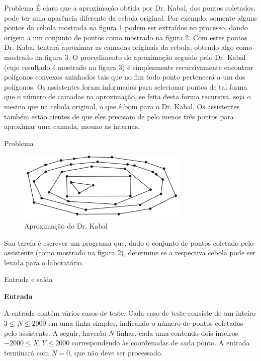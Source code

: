\begin{frame}[fragile]{Problema}
É claro que a aproximação obtida por Dr. Kabal, dos pontos coletados, pode ter uma aparência diferente da cebola original. Por exemplo, somente alguns pontos da cebola mostrada na figura 1 podem ser extraídos no processo, dando origem a um conjunto de pontos como mostrado na figura 2. Com estes pontos Dr. Kabal tentará aproximar as camadas originais da cebola, obtendo algo como mostrado na figura 3. O procedimento de aproximação seguido pelo Dr. Kabal (cujo resultado é mostrado na figura 3) é simplesmente recursivamente encontrar polígonos convexos aninhados tais que no fim todo ponto pertencerá a um dos polígonos. Os assistentes foram informados para selecionar pontos de tal forma que o número de camadas na aproximação, se feita desta forma recursiva, seja o mesmo que na cebola original, o que é bom para o Dr. Kabal. Os assistentes também estão cientes de que eles precisam de pelo menos três pontos para aproximar uma camada, mesmo as internas.
\end{frame}

\begin{frame}[fragile]{Problema}

\begin{figure}
    \centering
    \includegraphics[scale=0.75]{figure_3.png}
    \caption{Aproximação do Dr. Kabal}
\end{figure}

Sua tarefa é escrever um programa que, dado o conjunto de pontos coletado pelo assistente (como mostrado na figura 2), determine se a respectiva cebola pode ser levada para o laboratório.

\end{frame}


\begin{frame}[fragile]{Entrada e saída}

\textbf{Entrada}

A entrada contém vários casos de teste. Cada caso de teste consiste de um inteiro $3\leq N\leq 2000$
 em uma linha simples, indicando o número de pontos coletados pelo assistente. A seguir, haverão 
$N$ linhas, cada uma contendo dois inteiros $-2000\leq X, Y\leq 2000$ correspondendo às coordenadas de cada ponto. A entrada terminará com $N = 0$, que não deve ser processado.

\end{frame}

